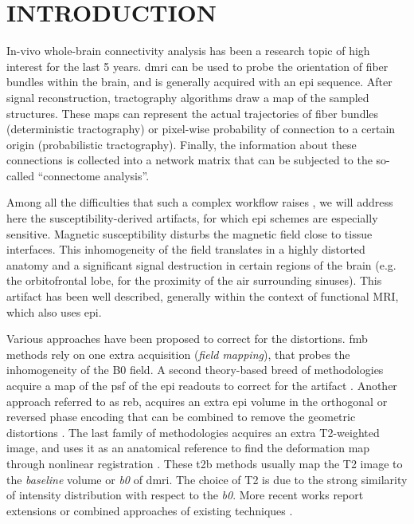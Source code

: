 \section{INTRODUCTION}
\label{sec:intro}
In-vivo whole-brain connectivity analysis has been a
research topic of high interest for the last 5 years.
\Gls*{dmri} can be used to probe the
orientation of fiber bundles within the brain,
and is generally acquired with an \gls*{epi} sequence.
After signal reconstruction,
tractography algorithms draw a map of the sampled 
structures.
These maps can represent the actual trajectories
of fiber bundles (deterministic tractography) or
pixel-wise probability of connection to a certain origin
(probabilistic tractography). Finally, the
information about these connections is collected
into a network matrix that can be subjected to
the so-called ``connectome analysis''.

Among all the difficulties that such a complex workflow
raises \cite{jones_twenty-five_2010}, we will
address here the susceptibility-derived artifacts,
for which \Gls*{epi} schemes are especially sensitive.
Magnetic susceptibility disturbs the magnetic field
close to tissue interfaces. This inhomogeneity
of the field translates in a highly distorted
anatomy and a significant signal destruction in
certain regions of the brain 
(e.g. the orbitofrontal lobe, for the proximity of the
air surrounding sinuses). This artifact has been
well described, generally within the context of
functional MRI, which also uses \gls*{epi}.

Various approaches have been proposed to correct
for the distortions. \Gls*{fmb} methods
\cite{jezzard_correction_1995} rely on one extra
acquisition (\emph{field mapping}),
that probes the inhomogeneity of the B0 field.
A second theory-based breed of methodologies acquire a 
map of the \acrlong*{psf} of the \gls*{epi} readouts to correct 
for the artifact \cite{robson_measurement_1997}.
Another approach referred to as \gls*{reb}, acquires an
extra \gls*{epi} volume in the orthogonal or reversed
phase encoding that can be combined to remove the
geometric distortions
\cite{cordes_geometric_2000,chiou_simple_2000}.
The last family of methodologies acquires an
extra T2-weighted image, and uses it as an anatomical
reference to find the deformation map through nonlinear 
registration \cite{kybic_unwarping_2000,studholme_accurate_2000}.
These \gls*{t2b} methods usually map
the T2 image to the \emph{baseline} volume or \textit{b0}
of \gls*{dmri}. The choice of T2 is due to the strong
similarity of intensity distribution with respect to the \textit{b0}.
More recent works report extensions or combined
approaches of existing techniques
\cite{andersson_how_2003,zaitsev_point_2004,%
holland_efficient_2010,andersson_comprehensive_2012}.

